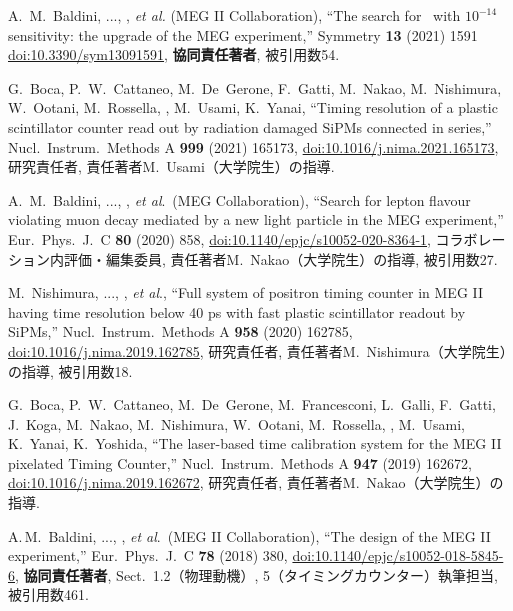 \begin{enumerate}
A.~M.~Baldini, ..., \me, {\it et al.} (MEG II Collaboration),
``The search for \megc\ with $10^{-14}$ sensitivity: the upgrade of the MEG experiment,''
Symmetry {\bf 13} (2021) 1591
\href{https://doi.org/10.3390/sym13091591}{doi:10.3390/sym13091591}, 
\textbf{協同責任著者}, 被引用数54.

G.~Boca, P.~W.~Cattaneo, M.~De~Gerone, F.~Gatti, M.~Nakao, M.~Nishimura, W.~Ootani, M.~Rossella, \me, M.~Usami, K.~Yanai, ``Timing resolution of a plastic scintillator counter read out by radiation damaged SiPMs connected in series,'' Nucl.\ Instrum.\ Methods A {\bf 999} (2021) 165173,
\href{https://doi.org/10.1016/j.nima.2021.165173}{doi:10.1016/j.nima.2021.165173},
研究責任者, 責任著者M.~Usami（大学院生）の指導.

A.~M.~Baldini, ..., \me, {\it et al}.\ (MEG Collaboration),
``Search for lepton flavour violating muon decay mediated by a new light particle in the MEG experiment,'' Eur.\ Phys.\ J.\ C \textbf{80} (2020) 858,
\href{https://doi.org/10.1140/epjc/s10052-020-8364-1}{doi:10.1140/epjc/s10052-020-8364-1},
コラボレーション内評価・編集委員,  責任著者M.~Nakao（大学院生）の指導, 被引用数27.

M.~Nishimura, ..., \me, {\it et al}., 
``Full system of positron timing counter in MEG II having time resolution below 40 ps with fast plastic scintillator readout by SiPMs,''
Nucl.\ Instrum.\ Methods A \textbf{958} (2020) 162785,
\href{https://doi.org/10.1016/j.nima.2019.162785}{doi:10.1016/j.nima.2019.162785},
研究責任者,  責任著者M.~Nishimura（大学院生）の指導, 被引用数18.

  G.~Boca, P.~W.~Cattaneo, M.~De~Gerone, M.~Francesconi, L.~Galli, F.~Gatti, J.~Koga,
  M.~Nakao, M.~Nishimura, W.~Ootani, M.~Rossella, \me, M.~Usami, K.~Yanai, K.~Yoshida,
  ``The laser-based time calibration system for the MEG II pixelated Timing Counter,''
  Nucl.\ Instrum.\ Methods A {\bf 947}  (2019) 162672,
  \href{https://doi.org/10.1016/j.nima.2019.162672}{doi:10.1016/j.nima.2019.162672},
  研究責任者,  責任著者M.~Nakao（大学院生）の指導.
	 
A.\,M.~Baldini, ..., \me, {\it et al}.\ (MEG II Collaboration),
  ``The design of the MEG II experiment,''
  Eur.\ Phys.\ J.\ C {\bf 78}  (2018) 380,
  \href{https://doi.org/10.1140/epjc/s10052-018-5845-6}{doi:10.1140/epjc/s10052-018-5845-6},
  \textbf{協同責任著者}, Sect.\ 1.2（物理動機）, 5（タイミングカウンター）執筆担当, 被引用数461.


\end{enumerate}
